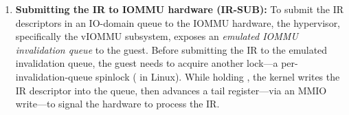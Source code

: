 \begin{enumerate}[leftmargin=*]
\item {\bf Submitting the IR to IOMMU hardware (IR-SUB):} 
To submit the IR descriptors in an IO-domain 
    queue to the IOMMU hardware, 
    the hypervisor, specifically the vIOMMU subsystem, exposes 
    an {\it emulated IOMMU invalidation queue} to the guest.
Before submitting the IR to the emulated invalidation queue, the guest needs to acquire another lock---a 
    per-invalidation-queue spinlock ( in Linux). 
    While holding , the kernel writes the IR descriptor into the queue, 
    then advances a tail register---via an MMIO write---to signal the hardware 
    to process the IR. 
\end{enumerate}







